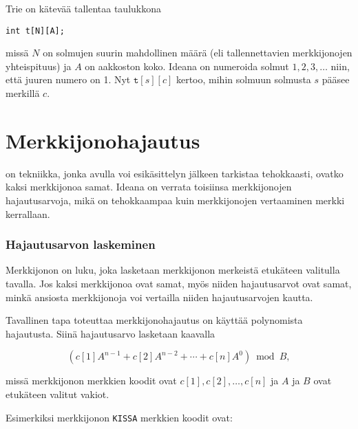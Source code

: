 Trie on kätevää tallentaa taulukkona
\begin{lstlisting}
int t[N][A];
\end{lstlisting}
missä $N$ on solmujen suurin mahdollinen määrä
(eli tallennettavien merkkijonojen yhteispituus)
ja $A$ on aakkoston koko.
Ideana on numeroida solmut $1,2,3,\ldots$ niin,
että juuren numero on 1.
Nyt $\texttt{t}[s][c]$ kertoo,
mihin solmuun solmusta $s$ pääsee merkillä $c$.

\section{Merkkijonohajautus}


on tekniikka, jonka avulla voi esikäsittelyn
jälkeen tarkistaa tehokkaasti, ovatko
kaksi merkkijonoa samat.
Ideana on verrata toisiinsa merkkijonojen hajautusarvoja,
mikä on tehokkaampaa kuin merkkijonojen
vertaaminen merkki kerrallaan.

\subsubsection*{Hajautusarvon laskeminen}


Merkkijonon 
on luku, joka lasketaan merkkijonon merkeistä
etukäteen valitulla tavalla.
Jos kaksi merkkijonoa ovat samat,
myös niiden hajautusarvot ovat samat,
minkä ansiosta merkkijonoja voi vertailla
niiden hajautusarvojen kautta.

Tavallinen tapa toteuttaa merkkijonohajautus
on käyttää polynomista hajautusta.
Siinä hajautusarvo lasketaan kaavalla

\[(c[1] A^{n-1} + c[2] A^{n-2} + \cdots + c[n] A^0) \bmod B  ,\]

missä merkkijonon merkkien koodit ovat
$c[1],c[2],\ldots,c[n]$ ja $A$ ja $B$ ovat etukäteen
valitut vakiot.

Esimerkiksi merkkijonon \texttt{KISSA} merkkien koodit ovat:
\begin{center}
\end{center}


